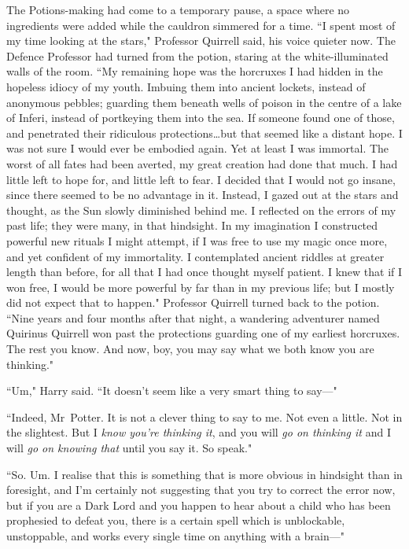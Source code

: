 The Potions-making had come to a temporary pause, a space where no ingredients were added while the cauldron simmered for a time. ``I spent most of my time looking at the stars," Professor Quirrell said, his voice quieter now. The Defence Professor had turned from the potion, staring at the white-illuminated walls of the room. ``My remaining hope was the horcruxes I had hidden in the hopeless idiocy of my youth. Imbuing them into ancient lockets, instead of anonymous pebbles; guarding them beneath wells of poison in the centre of a lake of Inferi, instead of portkeying them into the sea. If someone found one of those, and penetrated their ridiculous protections…but that seemed like a distant hope. I was not sure I would ever be embodied again. Yet at least I was immortal. The worst of all fates had been averted, my great creation had done that much. I had little left to hope for, and little left to fear. I decided that I would not go insane, since there seemed to be no advantage in it. Instead, I gazed out at the stars and thought, as the Sun slowly diminished behind me. I reflected on the errors of my past life; they were many, in that hindsight. In my imagination I constructed powerful new rituals I might attempt, if I was free to use my magic once more, and yet confident of my immortality. I contemplated ancient riddles at greater length than before, for all that I had once thought myself patient. I knew that if I won free, I would be more powerful by far than in my previous life; but I mostly did not expect that to happen." Professor Quirrell turned back to the potion. ``Nine years and four months after that night, a wandering adventurer named Quirinus Quirrell won past the protections guarding one of my earliest horcruxes. The rest you know. And now, boy, you may say what we both know you are thinking."

``Um," Harry said. ``It doesn't seem like a very smart thing to say—"

``Indeed, Mr~Potter. It is not a clever thing to say to me. Not even a little. Not in the slightest. But I \emph{know you're thinking it}, and you will \emph{go on thinking it} and I will \emph{go on knowing that} until you say it. So speak."

``So. Um. I realise that this is something that is more obvious in hindsight than in foresight, and I'm certainly not suggesting that you try to correct the error now, but if you are a Dark Lord and you happen to hear about a child who has been prophesied to defeat you, there is a certain spell which is unblockable, unstoppable, and works every single time on anything with a brain—"

